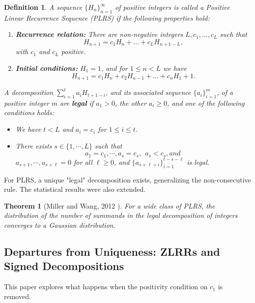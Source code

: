 \documentclass[11pt]{amsart}
\theoremstyle{plain}
\numberwithin{equation}{section} %
\newtheorem{theorem}[thm]{Theorem}
\newtheorem{definition}[thm]{Definition}
\numberwithin{table}{section} %
\numberwithin{figure}{section}
\begin{document}
	\begin{definition}
		A sequence $\{H_{n}\}_{n=1}^{\infty}$ of positive integers is called a Positive Linear Recurrence Sequence (PLRS) if the following properties hold:
		\begin{enumerate}
			\item \textbf{Recurrence relation:} There are non-negative integers $L, c_{1}, \dots, c_{L}$ such that
			\begin{equation*}
				H_{n+1} = c_{1}H_{n} + \dots + c_{L}H_{n+1-L},
			\end{equation*}
			with $c_{1}$ and $c_{L}$ positive.
			\item \textbf{Initial conditions:} $H_{1}=1$, and for $1 \le n < L$ we have
			\begin{equation*}
				H_{n+1} = c_{1}H_{n} + c_{2}H_{n-1} + \dots + c_{n}H_{1} + 1.
			\end{equation*}
		\end{enumerate}
		A decomposition $\sum_{i=1}^{t} a_{i} H_{t+1-i}$, and its associated  sequence $\{ a_i\}_{i=1}^m$, of a positive integer $m$ are \textbf{legal}  if $a_{1} > 0$, the other $a_{i} \ge 0$, and one of the following conditions holds:
		\begin{itemize}
			\item [(i)] We have $t < L$ and $ a_i=c_i$ for $1 \leq i \leq t$.
			\item [(ii)] There exists $s \in \{ 1, \cdots, L\}$ such that 
			$$a_1=c_1, \cdots, a_s=c_s, \ \ a_s< c_s, and \ $$
			$a_{s+1}, \cdots, a_{s+\ell}=0$ for all $\ell \geq 0$, and 
			$\{a_{s+\ell+i}\}_{i=1}^{t-s-\ell}$ is legal.
		\end{itemize}
	\end{definition}
	
	For PLRS, a unique "legal" decomposition exists, generalizing the non-consecutive rule. The statistical results were also extended.
	
	\begin{theorem}[Miller and Wang, 2012 \cite{MillerWang2012JCTA}]
		For a wide class of PLRS, the distribution of the number of summands in the legal decomposition of integers converges to a Gaussian distribution.
	\end{theorem}
	
	\subsection{Departures from Uniqueness: ZLRRs and Signed Decompositions}
	This paper explores what happens when the positivity condition on $c_1$ is removed.
	
\end{document}
